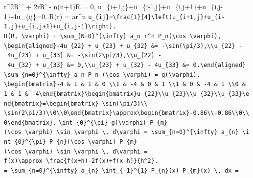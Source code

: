 \documentclass[
  ukrainian,
]{article}
\begin{document}
r\^{}2R'\,' + 2rR' - n(n+1)R = 0,
u\_\{i+1,j\}+u\_\{i-1,j\}+u\_\{i,j+1\}+u\_\{i,j-1\}-4u\_\{ij\}=0. R(r) =
ar\^{}n
\texttt{u\_\{ij\}=\textbackslash{}frac\{1\}\{4\}\textbackslash{}left(u\_\{i+1,j\}+u\_\{i-1,j\}+u\_\{i,j+1\}+u\_\{i,j-1\}\textbackslash{}right).}
\texttt{U(R,\ \textbackslash{}varphi)\ =\ \textbackslash{}sum\_\{N=0\}\^{}\{\textbackslash{}infty\}\ a\_n\ r\^{}n\ P\_n(\textbackslash{}cos\ \textbackslash{}varphi),}
\texttt{\textbackslash{}begin\{aligned\}-4u\_\{22\}\ +\ u\_\{23\}\ +\ u\_\{32\}\ \&=\ -\textbackslash{}sin(\textbackslash{}pi/3),\textbackslash{}\textbackslash{}u\_\{22\}\ -\ 4u\_\{23\}\ +\ u\_\{33\}\ \&=\ -\textbackslash{}sin(2\textbackslash{}pi/3),\textbackslash{}\textbackslash{}u\_\{22\}\ -\ 4u\_\{32\}\ +\ u\_\{33\}\ \&=\ 0,\textbackslash{}\textbackslash{}u\_\{23\}\ +\ u\_\{32\}\ -\ 4u\_\{33\}\ \&=\ 0.\textbackslash{}end\{aligned\}}
\texttt{\textbackslash{}sum\_\{n=0\}\^{}\{\textbackslash{}infty\}\ a\_n\ P\_n\ (\textbackslash{}cos\ \textbackslash{}varphi)\ =\ g(\textbackslash{}varphi).}
\texttt{\textbackslash{}begin\{bmatrix\}-4\ \&\ 1\ \&\ 1\ \&\ 0\ \textbackslash{}\textbackslash{}1\ \&\ -4\ \&\ 0\ \&\ 1\ \textbackslash{}\textbackslash{}1\ \&\ 0\ \&\ -4\ \&\ 1\ \textbackslash{}\textbackslash{}0\ \&\ 1\ \&\ 1\ \&\ -4\textbackslash{}end\{bmatrix\}\textbackslash{}begin\{bmatrix\}u\_\{22\}\textbackslash{}\textbackslash{}u\_\{23\}\textbackslash{}\textbackslash{}u\_\{32\}\textbackslash{}\textbackslash{}u\_\{33\}\textbackslash{}end\{bmatrix\}=\textbackslash{}begin\{bmatrix\}-\textbackslash{}sin(\textbackslash{}pi/3)\textbackslash{}\textbackslash{}-\textbackslash{}sin(2\textbackslash{}pi/3)\textbackslash{}\textbackslash{}0\textbackslash{}\textbackslash{}0\textbackslash{}end\{bmatrix\}\textbackslash{}approx\textbackslash{}begin\{bmatrix\}-0.86\textbackslash{}\textbackslash{}-0.86\textbackslash{}\textbackslash{}0\textbackslash{}\textbackslash{}0\textbackslash{}end\{bmatrix\}.}
\texttt{\textbackslash{}int\_\{0\}\^{}\{\textbackslash{}pi\}\ g(\textbackslash{}varphi)\ P\_\{m\}(\textbackslash{}cos\ \textbackslash{}varphi)\ \textbackslash{}sin\ \textbackslash{}varphi\ \textbackslash{},\ d\textbackslash{}varphi\ =\ \textbackslash{}sum\_\{n=0\}\^{}\{\textbackslash{}infty\}\ a\_\{n\}\ \textbackslash{}int\_\{0\}\^{}\{\textbackslash{}pi\}\ P\_\{n\}(\textbackslash{}cos\ \textbackslash{}varphi)\ P\_\{m\}(\textbackslash{}cos\ \textbackslash{}varphi)\ \textbackslash{}sin\ \textbackslash{}varphi\ \textbackslash{},\ d\textbackslash{}varphi\ =}
\texttt{f\textquotesingle{}\textquotesingle{}(x)\textbackslash{}approx\ \textbackslash{}frac\{f(x+h)-2f(x)+f(x-h)\}\{h\^{}2\}.}
\texttt{=\ \textbackslash{}sum\_\{n=0\}\^{}\{\textbackslash{}infty\}\ a\_\{n\}\ \textbackslash{}int\_\{-1\}\^{}\{1\}\ P\_\{n\}(x)\ P\_\{m\}(x)\ \textbackslash{},\ dx\ =}
\end{document}
